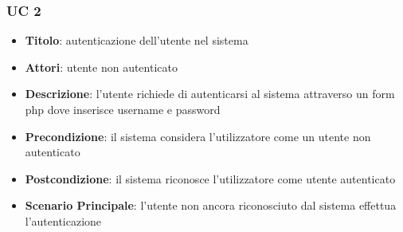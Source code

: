 \subsubsection{UC 2}

	\begin{itemize}
		\item \textbf{Titolo}: autenticazione dell'utente nel sistema
		\item \textbf{Attori}: utente non autenticato
		\item \textbf{Descrizione}: l'utente richiede di autenticarsi al sistema attraverso un
		form php dove inserisce username e password
		\item \textbf{Precondizione}: il sistema considera l’utilizzatore come un utente non autenticato
		\item \textbf{Postcondizione}: il sistema riconosce l'utilizzatore come utente autenticato
		\item \textbf{Scenario Principale}: l'utente non ancora riconosciuto dal sistema effettua l'autenticazione
	\end{itemize}
	
